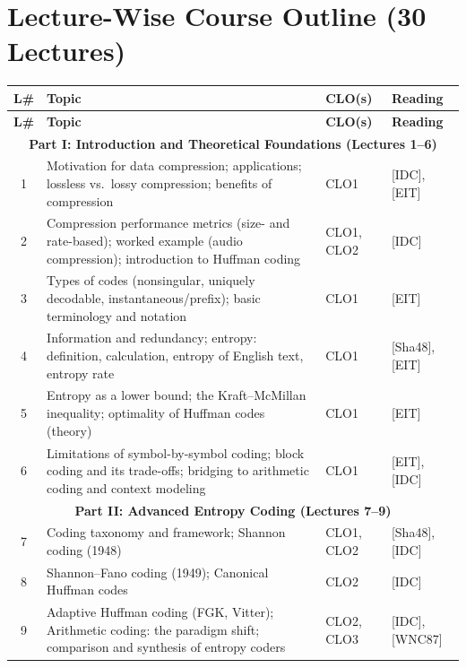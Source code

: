 \documentclass{article}
\begin{document}
\section*{Lecture-Wise Course Outline (30 Lectures)}
\renewcommand{\arraystretch}{1.35}
\setlength{\tabcolsep}{4pt}
\footnotesize
\begin{longtable}{|c|p{8.7cm}|p{1.6cm}|p{2.6cm}|}
\hline
\textbf{L\#} & \textbf{Topic} & \textbf{CLO(s)} & \textbf{Reading} \\ \hline
\endfirsthead
\hline
\textbf{L\#} & \textbf{Topic} & \textbf{CLO(s)} & \textbf{Reading} \\ \hline
\endhead

\multicolumn{4}{|c|}{\cellcolor{gray!20}\textbf{Part I: Introduction and Theoretical Foundations (Lectures 1--6)}} \\ \hline
1 & Motivation for data compression; applications; lossless vs.\ lossy compression; benefits of compression & CLO1 & [IDC], [EIT] \\ \hline
2 & Compression performance metrics (size- and rate-based); worked example (audio compression); introduction to Huffman coding & CLO1, CLO2 & [IDC] \\ \hline
3 & Types of codes (nonsingular, uniquely decodable, instantaneous/prefix); basic terminology and notation & CLO1 & [EIT] \\ \hline
4 & Information and redundancy; entropy: definition, calculation, entropy of English text, entropy rate & CLO1 & [Sha48], [EIT] \\ \hline
5 & Entropy as a lower bound; the Kraft--McMillan inequality; optimality of Huffman codes (theory) & CLO1 & [EIT] \\ \hline
6 & Limitations of symbol-by-symbol coding; block coding and its trade-offs; bridging to arithmetic coding and context modeling & CLO1 & [EIT], [IDC] \\ \hline

\multicolumn{4}{|c|}{\cellcolor{gray!20}\textbf{Part II: Advanced Entropy Coding (Lectures 7--9)}} \\ \hline
7 & Coding taxonomy and framework; Shannon coding (1948) & CLO1, CLO2 & [Sha48], [IDC] \\ \hline
8 & Shannon--Fano coding (1949); Canonical Huffman codes & CLO2 & [IDC] \\ \hline
9 & Adaptive Huffman coding (FGK, Vitter); Arithmetic coding: the paradigm shift; comparison and synthesis of entropy coders & CLO2, CLO3 & [IDC], [WNC87] \\ \hline


\end{longtable}
\end{document}

